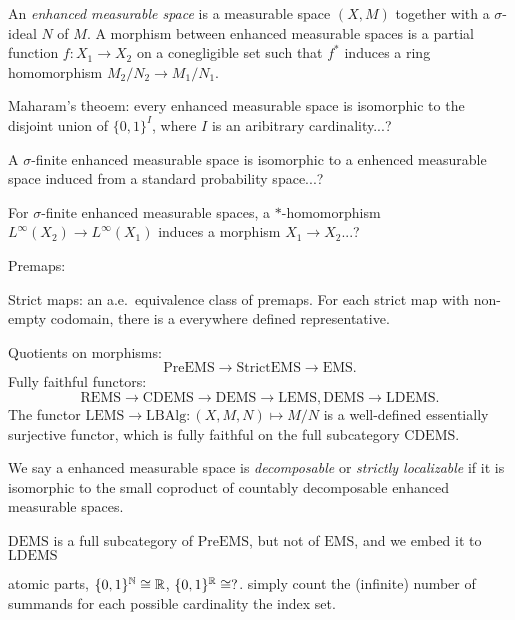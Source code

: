 \documentclass{../../large}
\begin{document}
\begin{prb}
An \emph{enhanced measurable space} is a measurable space $(X,M)$ together with a $\sigma$-ideal $N$ of $M$.
A morphism between enhanced measurable spaces is a partial function $f:X_1\to X_2$ on a conegligible set such that $f^*$ induces a ring homomorphism $M_2/N_2\to M_1/N_1$.
\begin{parts}
\item Maharam's theoem: every enhanced measurable space is isomorphic to the disjoint union of $\{0,1\}^I$, where $I$ is an aribitrary cardinality...?
\item A $\sigma$-finite enhanced measurable space is isomorphic to a enhenced measurable space induced from a standard probability space...?
\item For $\sigma$-finite enhanced measurable spaces, a $*$-homomorphism $L^\infty(X_2)\to L^\infty(X_1)$ induces a morphism $X_1\to X_2$...?
\end{parts}
\end{prb}


Premaps: 

Strict maps: an a.e.~equivalence class of premaps. For each strict map with non-empty codomain, there is a everywhere defined representative.


Quotients on morphisms:
\[\mathrm{PreEMS}\to\mathrm{StrictEMS}\to\mathrm{EMS}.\]
Fully faithful functors:
\[\mathrm{REMS}\to\mathrm{CDEMS}\to\mathrm{DEMS}\to\mathrm{LEMS}, \mathrm{DEMS}\to\mathrm{LDEMS}.\]
The functor $\mathrm{LEMS}\to\mathrm{LBAlg}:(X,M,N)\mapsto M/N$ is a well-defined essentially surjective functor, which is fully faithful on the full subcategory $\mathrm{CDEMS}$.

We say a enhanced measurable space is \emph{decomposable} or \emph{strictly localizable} if it is isomorphic to the small coproduct of countably decomposable enhanced measurable spaces.

$\mathrm{DEMS}$ is a full subcategory of $\mathrm{PreEMS}$, but not of $\mathrm{EMS}$, and we embed it to $\mathrm{LDEMS}$










\begin{prb}
atomic parts, $\{0,1\}^{\mathbb{N}}\cong\mathbb{R}$, $\{0,1\}^{\mathbb{R}}\cong?$.
simply count the (infinite) number of summands for each possible cardinality the index set.
\end{prb}
\end{document}
